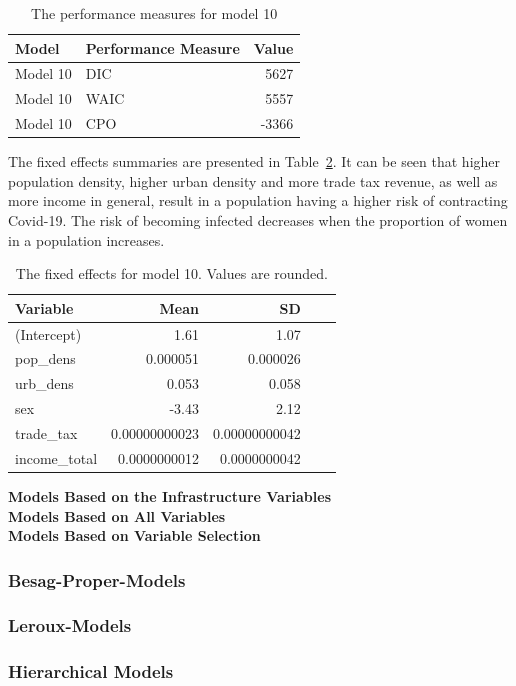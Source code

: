 \begin{table}[H] 
\caption{The performance measures for model 10 \label{model10}}
\begin{tabular}{l l r}
\toprule
\textbf{Model}	& \textbf{Performance Measure}	& \textbf{Value} \\
\midrule
Model 10 & DIC & 5627 \\
Model 10 & WAIC & 5557 \\
Model 10 & CPO & -3366 \\
\bottomrule
\end{tabular}
\end{table}
The fixed effects summaries are presented in Table~\ref{fixed10}. It can be seen that higher population density, higher urban density and more trade tax revenue, as well as more income in general, result in a population having a higher risk of contracting Covid-19. The risk of becoming infected decreases when the proportion of women in a population increases.
\begin{table}[H] 
\caption{The fixed effects for model 10. Values are rounded. \label{fixed10}}
\begin{tabular}{l r r r r}
\toprule
\textbf{Variable}	& \textbf{Mean}	& \textbf{SD} \\
\midrule
(Intercept) & 1.61 & 1.07 \\
pop\_dens & 0.000051 & 0.000026 \\
urb\_dens & 0.053 & 0.058 \\
sex & -3.43 & 2.12 \\
trade\_tax & 0.00000000023 & 0.00000000042 \\
income\_total &  0.0000000012 & 0.0000000042 \\
\bottomrule
\end{tabular}
\end{table}
\textbf{Models Based on the Infrastructure Variables} \\
\textbf{Models Based on All Variables} \\
\textbf{Models Based on Variable Selection} 
\subsubsection{Besag-Proper-Models}
\subsubsection{Leroux-Models}
\subsubsection{Hierarchical Models}
